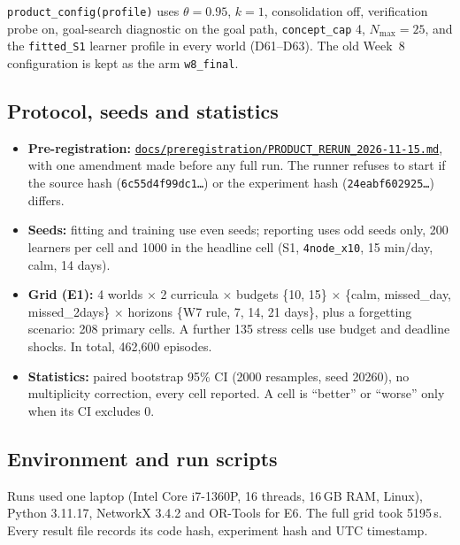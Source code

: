 \documentclass[11pt,a4paper]{article}
\newcommand{\finaltag}{cs5903-final-2026}
\newcommand{\repobase}{https://github.com/vhemanth06/AdaptEngine}
\newcommand{\repo}[1]{\href{\repobase/blob/\finaltag/#1}{\nolinkurl{#1}}}
\begin{document}
\texttt{product\_config(profile)} uses $\theta=0.95$, $k=1$, consolidation off, verification probe on, goal-search diagnostic on the goal path, \texttt{concept\_cap} 4, $N_{\max}=25$, and the \texttt{fitted\_S1} learner profile in every world (D61--D63). The old Week~8 configuration is kept as the arm \texttt{w8\_final}.

\subsection{Protocol, seeds and statistics}

\begin{itemize}
\item \textbf{Pre-registration:} \repo{docs/preregistration/PRODUCT_RERUN_2026-11-15.md}, with one amendment made before any full run. The runner refuses to start if the source hash (\texttt{6c55d4f99dc1\ldots}) or the experiment hash (\texttt{24eabf602925\ldots}) differs.
\item \textbf{Seeds:} fitting and training use even seeds; reporting uses odd seeds only, 200 learners per cell and 1000 in the headline cell (S1, \texttt{4node\_x10}, 15 min/day, calm, 14 days).
\item \textbf{Grid (E1):} 4 worlds $\times$ 2 curricula $\times$ budgets \{10, 15\} $\times$ \{calm, missed\_day, missed\_2days\} $\times$ horizons \{W7 rule, 7, 14, 21 days\}, plus a forgetting scenario: 208 primary cells. A further 135 stress cells use budget and deadline shocks. In total, 462,600 episodes.
\item \textbf{Statistics:} paired bootstrap 95\% CI (2000 resamples, seed 20260), no multiplicity correction, every cell reported. A cell is ``better'' or ``worse'' only when its CI excludes 0.
\end{itemize}

\subsection{Environment and run scripts}

Runs used one laptop (Intel Core i7-1360P, 16 threads, 16\,GB RAM, Linux), Python 3.11.17, NetworkX 3.4.2 and OR-Tools for E6. The full grid took 5195\,s. Every result file records its code hash, experiment hash and UTC timestamp.
\end{document}
